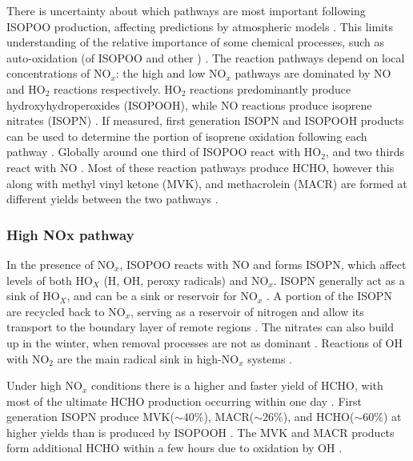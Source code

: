       There is uncertainty about which pathways are most important following ISOPOO production, affecting predictions by atmospheric models \parencite{Nguyen2014}.
      This limits understanding of the relative importance of some chemical processes, such as auto-oxidation (of ISOPOO and other \roo) \parencite{Crounse2013}.
      The reaction pathways depend on local concentrations of NO$_x$: the high and low NO$_x$ pathways are dominated by NO and HO$_2$ reactions respectively.
      HO$_2$ reactions predominantly produce hydroxyhydroperoxides (ISOPOOH), while NO reactions produce isoprene nitrates (ISOPN) \parencite{Crounse2006}.
      If measured, first generation ISOPN and ISOPOOH products can be used to determine the portion of isoprene oxidation following each pathway \parencite[eg.][]{Yu2016}.
      Globally around one third of ISOPOO react with HO$_2$, and two thirds react with NO \parencite{Paulot2009b}.
      Most of these reaction pathways produce HCHO, however this along with methyl vinyl ketone (MVK), and methacrolein (MACR) are formed at different yields between the two pathways \parencite{Marais2012, Liu2016a, Wolfe2016}.
      
      
      
      
    \subsubsection{High NOx pathway}
      In the presence of NO$_x$, ISOPOO reacts with NO and forms ISOPN, which affect levels of both HO$_X$ (H, OH, peroxy radicals) and NO$_x$.
      ISOPN generally act as a sink of HO$_X$, and can be a sink or reservoir for NO$_x$ \parencite[][]{Mao2013}.
      A portion of the ISOPN are recycled back to NO$_x$, serving as a reservoir of nitrogen and allow its transport to the boundary layer of remote regions \parencite{Patchen2007,Paulot2009a,Yu2016}.
      The nitrates can also build up in the winter, when removal processes are not as dominant \parencite{Lelieveld2009}.
      Reactions of OH with NO$_2$ are the main radical sink in high-NO$_x$ systems \parencite{Wolfe2012}.
      
      Under high NO$_x$ conditions there is a higher and faster yield of HCHO, with most of the ultimate HCHO production occurring within one day \parencite{Palmer2006}.
      First generation ISOPN produce MVK($\sim 40\%$), MACR($\sim 26\%$), and HCHO($\sim 60\%$) at higher yields than is produced by ISOPOOH \parencite{Liu2013,Mao2013}.
      The MVK and MACR products form additional HCHO within a few hours due to oxidation by OH \parencite{Palmer2006}.
      
